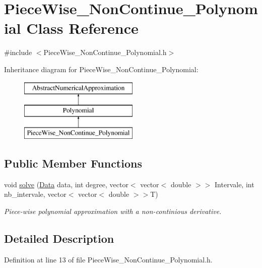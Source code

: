 \hypertarget{class_piece_wise___non_continue___polynomial}{}\section{Piece\+Wise\+\_\+\+Non\+Continue\+\_\+\+Polynomial Class Reference}
\label{class_piece_wise___non_continue___polynomial}


{\ttfamily \#include $<$Piece\+Wise\+\_\+\+Non\+Continue\+\_\+\+Polynomial.\+h$>$}

Inheritance diagram for Piece\+Wise\+\_\+\+Non\+Continue\+\_\+\+Polynomial\+:\begin{figure}[H]
\begin{center}
\leavevmode
\includegraphics[height=3.000000cm]{class_piece_wise___non_continue___polynomial}
\end{center}
\end{figure}
\subsection*{Public Member Functions}
\begin{DoxyCompactItemize}
\item 
void \mbox{\hyperlink{class_piece_wise___non_continue___polynomial_a5d891bbe7a9f9c2d5d8f6a28b522bb52}{solve}} (\mbox{\hyperlink{struct_data}{Data}} data, int degree, vector$<$ vector$<$ double $>$$>$ Intervale, int nb\+\_\+intervale, vector$<$ vector$<$ double $>$$>$T)
\begin{DoxyCompactList}\small\item\em Piece-\/wise polynomial approximation with a non-\/continious derivative. \end{DoxyCompactList}\end{DoxyCompactItemize}


\subsection{Detailed Description}


Definition at line 13 of file Piece\+Wise\+\_\+\+Non\+Continue\+\_\+\+Polynomial.\+h.




